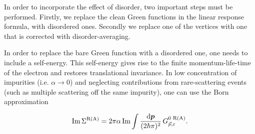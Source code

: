 In order to incorporate the effect of disorder, two important steps must be performed. Firstly, we replace the clean Green functions in the linear response formula, with disordered ones. Secondly we replace one of the vertices with one that is corrected with disorder-averaging.

In order to replace the bare Green function with a disordered one, one needs to include a self-energy. This self-energy gives rise to the finite momentum-life-time of the electron and restores translational invariance.  In low concentration of impurities (i.e. $\alpha\rightarrow0$) and neglecting contributions from rare-scattering events (such as multiple scattering off the same impurity), one can use the Born approximation

\begin{equation}
\operatorname{Im} \Sigma^\text{R(A)} = 2\pi\alpha \operatorname{Im} \int \frac{\mathrm{d}\boldsymbol{p}}{(2\hbar\pi)^2}\,G^\text{0 R(A)}_{\vec{p},\varepsilon}.
\label{sd:eq:sigma}
\end{equation}

